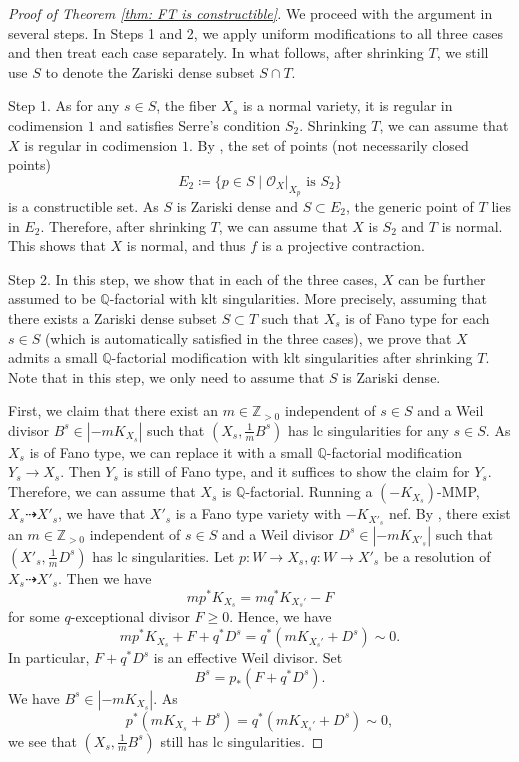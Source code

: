 \documentclass[11pt,oneside,reqno]{amsart}
\numberwithin{equation}{section}
\theoremstyle{definition}
\newcommand{\bQ}{\mathbb{Q}}
\newcommand{\bZ}{\mathbb{Z}}
\newcommand{\mO}{\mathcal{O}}
\begin{document}
\begin{proof}[Proof of Theorem \ref{thm: FT is constructible}]
We proceed with the argument in several steps. In Steps 1 and 2, we apply uniform modifications to all three cases and then treat each case separately. In what follows, after shrinking $T$, we still use $S$ to denote the Zariski dense subset $S \cap T$.

Step 1. As for any $s\in S$, the fiber $X_s$ is a normal variety, it is regular in codimension $1$ and satisfies Serre's condition $S_2$. Shrinking $T$, we can assume that $X$ is regular in codimension $1$. By \cite[(9.9.2)(viii)]{EGAIV},  the set of points (not necessarily closed points)
\[
E_2 \coloneqq \{p \in S \mid \mO_X|_{X_p} \text{~is~} S_2\}
\]
is a constructible set.  As $S$ is Zariski dense and $S\subset E_2$, the generic point of $T$ lies in $E_2$. Therefore, after shrinking $T$, we can assume that $X$ is $S_2$ and $T$ is normal. This shows that $X$ is normal, and thus $f$ is a projective contraction.

Step 2. In this step, we show that in each of the three cases, $X$ can be further assumed to be $\bQ$-factorial with klt singularities. More precisely, assuming that there exists a Zariski dense subset $S \subset T$ such that $X_s$ is of Fano type for each $s \in S$ (which is automatically satisfied in the three cases), we prove that $X$ admits a small $\bQ$-factorial modification with klt singularities after shrinking $T$. Note that in this step, we only need to assume that $S$ is Zariski dense.

First, we claim that there exist an $m\in \bZ_{>0}$ independent of $s\in S$ and a Weil divisor $B^s \in |-mK_{X_s}|$ such that $(X_s, \frac 1 m B^s)$ has lc singularities for any $s\in S$. As $X_s$ is of Fano type, we can replace it with a small $\bQ$-factorial modification $Y_s \to X_s$. Then $Y_s$ is still of Fano type, and it suffices to show the claim for $Y_s$. Therefore, we can assume that $X_s$ is $\bQ$-factorial. Running a $(-K_{X_s})$-MMP, $X_s \dasharrow X'_s$, we have that $X'_s$ is a Fano type variety with $-K_{X'_s}$ nef. By \cite[Theorem 1.7]{Birkar19}, there exist an $m\in \bZ_{>0}$  independent of $s\in S$ and a Weil divisor $D^s \in |-mK_{X'_s}|$ such that $(X'_s, \frac 1 m D^s)$ has lc singularities. Let $p: W \to X_s, q: W \to X'_s$ be a resolution of $X_s \dasharrow X'_s$.  Then we have
\[
mp^*K_{X_s} =mq^*K_{X_s'}-F
\] for some $q$-exceptional divisor $F \geq 0$. Hence, we have
\[
mp^*K_{X_s} +F+q^*D^s = q^*(mK_{X_s'}+D^s)\sim 0.
\] In particular, $F+q^*D^s$ is an effective Weil divisor. Set
\[
B^s= p_*(F+q^*D^s).
\] We have $B^s \in |-mK_{X_s}|$. As
\[
p^*(mK_{X_s}+B^s)=q^*(mK_{X_s'}+D^s)\sim 0,
\] we see that $(X_s, \frac 1 m B^s)$ still has lc singularities.


\end{proof}
\end{document}
